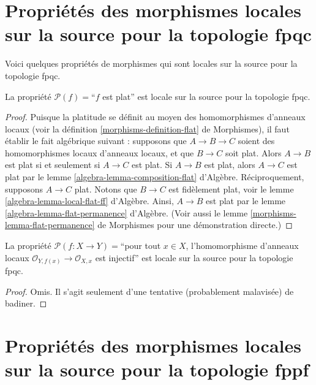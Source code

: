 \section[Localité sur la source (fpqc)]{Propriétés des morphismes locales sur la source pour la topologie fpqc}
\label{section-fpqc-local-source}

\noindent
Voici quelques propriétés de morphismes qui sont locales sur la source pour la
topologie fpqc.

\begin{lemma}
\label{lemma-flat-fpqc-local-source}
La propriété $\mathcal{P}(f)=$``$f$ est plat'' est locale sur la source pour la
topologie fpqc.
\end{lemma}

\begin{proof}
Puisque la platitude se définit au moyen des homomorphismes d'anneaux locaux
(voir la définition \ref{morphisms-definition-flat} de Morphismes),
il faut établir le fait algébrique suivant : supposons que
$A \to B \to C$ soient des homomorphismes locaux d'anneaux locaux, et que
$B \to C$ soit plat. Alors $A \to B$ est plat si et seulement si
$A \to C$ est plat.
Si $A \to B$ est plat, alors $A \to C$ est plat par
le lemme \ref{algebra-lemma-composition-flat} d'Algèbre.
Réciproquement, supposons $A \to C$ plat.
Notons que $B \to C$ est fidèlement plat, voir
le lemme \ref{algebra-lemma-local-flat-ff} d'Algèbre.
Ainsi, $A \to B$ est plat par
le lemme \ref{algebra-lemma-flat-permanence} d'Algèbre.
(Voir aussi le lemme \ref{morphisms-lemma-flat-permanence} de Morphismes
pour une démonstration directe.)
\end{proof}

\begin{lemma}
\label{lemma-injective-local-rings-fpqc-local-source}
La propriété
$\mathcal{P}(f : X \to Y)=$``pour tout $x \in X$, l'homomorphisme d'anneaux
locaux $\mathcal{O}_{Y, f(x)} \to \mathcal{O}_{X, x}$ est injectif''
est locale sur la source pour la topologie fpqc.
\end{lemma}

\begin{proof}
Omis. Il s'agit seulement d'une tentative (probablement malavisée) de badiner.
\end{proof}





\section{Propriétés des morphismes locales sur la source pour la topologie fppf}
\label{section-fppf-local-source}

